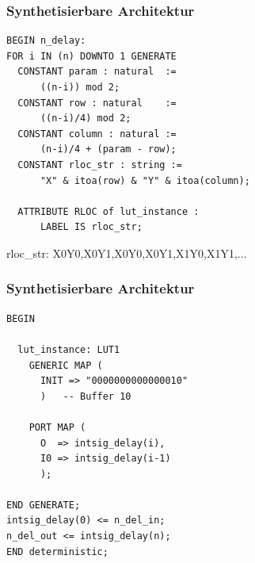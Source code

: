\documentclass{beamer}
\begin{document}
    \begin{frame}[fragile]
        \frametitle{Synthetisierbare Architektur}
        \begin{lstlisting}[style=vhdl]
BEGIN n_delay:
FOR i IN (n) DOWNTO 1 GENERATE
  CONSTANT param : natural  := 
      ((n-i)) mod 2;
  CONSTANT row : natural    := 
      ((n-i)/4) mod 2;
  CONSTANT column : natural := 
      (n-i)/4 + (param - row);
  CONSTANT rloc_str : string := 
      "X" & itoa(row) & "Y" & itoa(column);
    
  ATTRIBUTE RLOC of lut_instance : 
      LABEL IS rloc_str;
        \end{lstlisting}
rloc\_str: X0Y0,X0Y1,X0Y0,X0Y1,X1Y0,X1Y1,...
\end{frame}
    \begin{frame}[fragile]
        \frametitle{Synthetisierbare Architektur}
        \begin{lstlisting}[style=vhdl]
BEGIN

  lut_instance: LUT1
    GENERIC MAP (
      INIT => "0000000000000010"
      )   -- Buffer 10
        
    PORT MAP (
      O  => intsig_delay(i),
      I0 => intsig_delay(i-1)
      );

END GENERATE;
intsig_delay(0) <= n_del_in;
n_del_out <= intsig_delay(n);
END deterministic;
        \end{lstlisting}
\end{frame}
\end{document}
